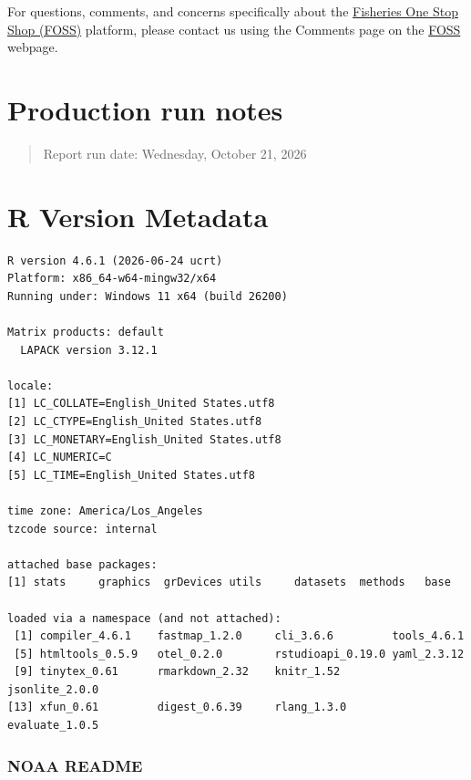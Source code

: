 \documentclass[
  letterpaper,
  oneside,
  open=any]{scrbook}
\begin{document}
For questions, comments, and concerns specifically about the
\href{https://www.fisheries.noaa.gov/foss}{Fisheries One Stop Shop
(FOSS)} platform, please contact us using the Comments page on the
\href{https://www.fisheries.noaa.gov/foss}{FOSS} webpage.

\chapter{Production run notes}\label{production-run-notes}

\begin{quote}
Report run date: Wednesday, October 21, 2026
\end{quote}

\chapter{R Version Metadata}\label{r-version-metadata}

\begin{verbatim}
R version 4.6.1 (2026-06-24 ucrt)
Platform: x86_64-w64-mingw32/x64
Running under: Windows 11 x64 (build 26200)

Matrix products: default
  LAPACK version 3.12.1

locale:
[1] LC_COLLATE=English_United States.utf8 
[2] LC_CTYPE=English_United States.utf8   
[3] LC_MONETARY=English_United States.utf8
[4] LC_NUMERIC=C                          
[5] LC_TIME=English_United States.utf8    

time zone: America/Los_Angeles
tzcode source: internal

attached base packages:
[1] stats     graphics  grDevices utils     datasets  methods   base     

loaded via a namespace (and not attached):
 [1] compiler_4.6.1    fastmap_1.2.0     cli_3.6.6         tools_4.6.1      
 [5] htmltools_0.5.9   otel_0.2.0        rstudioapi_0.19.0 yaml_2.3.12      
 [9] tinytex_0.61      rmarkdown_2.32    knitr_1.52        jsonlite_2.0.0   
[13] xfun_0.61         digest_0.6.39     rlang_1.3.0       evaluate_1.0.5   
\end{verbatim}

\subsection{NOAA README}\label{noaa-readme-1}
\end{document}
